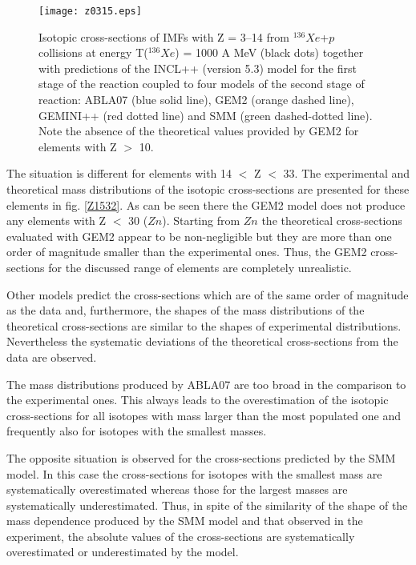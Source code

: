\begin{figure}
    \centering
    \texttt{[image: z0315.eps]}
    \caption{Isotopic cross-sections of IMFs with Z = 3–14 from $^{136}Xe$+$p$ collisions at energy T($^{136}Xe$) = 1000 A MeV \cite{napolitani2007measurement} (black dots) together with predictions of the INCL++ (version 5.3) model for the first stage of the reaction coupled to four models of the second stage of reaction: ABLA07 (blue solid line), GEM2 (orange dashed line), GEMINI++ (red dotted line) and SMM (green dashed-dotted line). Note the absence of the theoretical values provided by GEM2 for elements with Z $>$ 10.}
    \label{Z0314}
\end{figure}

The situation is different for elements with 14 $<$ Z $<$ 33. The experimental and theoretical mass distributions of the isotopic cross-sections are presented for these elements in fig. \ref{Z1532}. As can be seen there the GEM2 model does not produce any elements with Z $<$ 30 ($Zn$). Starting from $Zn$ the theoretical cross-sections evaluated with GEM2 appear to be non-negligible but they are more than one order of magnitude smaller than the experimental ones. Thus, the GEM2 cross-sections for the discussed range of elements are completely unrealistic. 

Other models predict the cross-sections which are of the same order of magnitude as the data and, furthermore, the shapes of the mass distributions of the theoretical cross-sections are similar to the shapes of experimental distributions. Nevertheless the systematic deviations of the theoretical cross-sections from the data are observed. 

The mass distributions produced by ABLA07 are too broad in the comparison to the experimental ones. This always leads to the overestimation of the isotopic cross-sections for all isotopes with mass larger than the most populated one and   frequently also for isotopes with the smallest masses. 

The opposite situation is observed for the cross-sections predicted by the SMM model. In this case the cross-sections for isotopes with the smallest mass are systematically overestimated whereas those for the largest masses are systematically underestimated. Thus, in spite of the similarity of the shape of the mass dependence produced by the SMM model and
that observed in the experiment, the absolute values of the cross-sections are systematically overestimated or underestimated by the model. 


